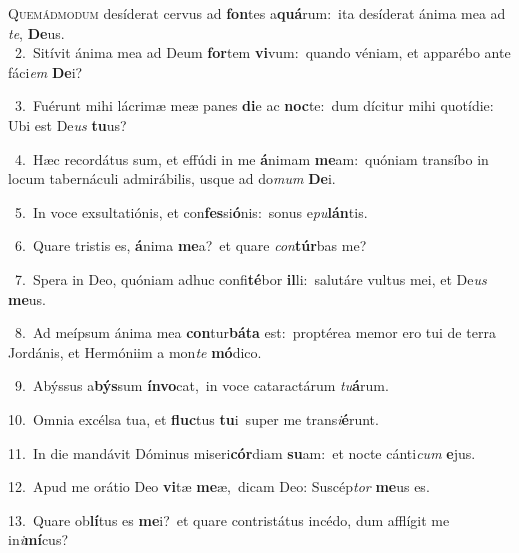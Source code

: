 \lettrine{\initial\textcolor{\initialcolor}{Q}}{uemádmodum} desíderat cervus ad \textbf{fon}\-tes a\-\textbf{quá}\-rum:~\star ita desíderat ánima mea ad \textit{te}\-, \textbf{De}\-us.\\
{\numbfont\textcolor{\numbcolor}{~2.}}~Sitívit ánima mea ad Deum \textbf{for}\-tem \textbf{vi}\-vum:~\star quando véniam, et apparébo ante fáci\textit{em} \textbf{De}\-i?\par
{\numbfont\textcolor{\numbcolor}{~3.}}~Fuérunt mihi lácrimæ meæ panes \textbf{di}\-e ac \textbf{noc}\-te:~\star dum dícitur mihi quotídie: Ubi est De\textit{us} \textbf{tu}\-us?\par
{\numbfont\textcolor{\numbcolor}{~4.}}~Hæc recordátus sum, et effúdi in me \textbf{á}\-nimam \textbf{me}\-am:~\star quóniam transíbo in locum tabernáculi admirábilis, usque ad do\textit{mum} \textbf{De}\-i.\par
{\numbfont\textcolor{\numbcolor}{~5.}}~In voce exsultatiónis, et con\-\textbf{fes}\-si\-\textbf{ó}\-nis:~\star sonus e\-\textit{pu}\-\textbf{lán}tis.\par
{\numbfont\textcolor{\numbcolor}{~6.}}~Quare tristis es, \textbf{á}\-nima \textbf{me}\-a?~\star et quare \textit{con}\-\textbf{túr}bas me?\par
{\numbfont\textcolor{\numbcolor}{~7.}}~Spera in Deo, quóniam adhuc confi\-\textbf{té}\-bor \textbf{il}\-li:~\star salutáre vultus mei, et De\textit{us} \textbf{me}\-us.\par
{\numbfont\textcolor{\numbcolor}{~8.}}~Ad meípsum ánima mea \textbf{con}\-tur\-\textbf{bá}\-\textbf{ta} est:~\star proptérea memor ero tui de terra Jordánis, et Hermóniim a mon\textit{te} \textbf{mó}\-dico.\par
{\numbfont\textcolor{\numbcolor}{~9.}}~Abýssus a\-\textbf{býs}\-sum \textbf{ín}\-\textbf{vo}cat,~\star in voce cataractárum \textit{tu}\-\textbf{á}rum.\par
{\numbfont\textcolor{\numbcolor}{10.}}~Omnia excélsa tua, et \textbf{fluc}\-tus \textbf{tu}\-i~\star super me trans\-\textit{i}\-\textbf{é}runt.\par
{\numbfont\textcolor{\numbcolor}{11.}}~In die mandávit Dóminus miseri\-\textbf{cór}\-diam \textbf{su}\-am:~\star et nocte cánti\textit{cum} \textbf{e}\-jus.\par
{\numbfont\textcolor{\numbcolor}{12.}}~Apud me orátio Deo \textbf{vi}\-tæ \textbf{me}\-æ,~\star dicam Deo: Suscép\textit{tor} \textbf{me}\-us es.\par
{\numbfont\textcolor{\numbcolor}{13.}}~Quare ob\-\textbf{lí}\-tus es \textbf{me}\-i?~\star et quare contristátus incédo, dum afflígit me in\-\textit{i}\-\textbf{mí}cus?\par
